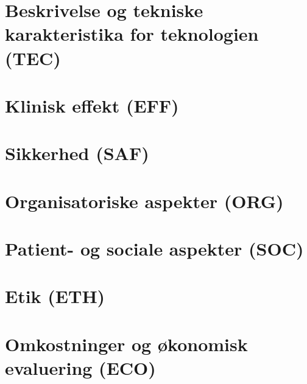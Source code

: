 \chapter{Beskrivelse og tekniske karakteristika for teknologien (TEC)}\vspace{-.75cm} \label{TEC_chap}


\chapter{Klinisk effekt (EFF)}\vspace{-.75cm} \label{EFF_chap}


\chapter{Sikkerhed (SAF)}\vspace{-.75cm} \label{SAF_chap}


\chapter{Organisatoriske aspekter (ORG)}\vspace{-.75cm} \label{ORG_chap}


\chapter{Patient- og sociale aspekter (SOC)}\vspace{-.75cm} \label{SOC_chap}


\chapter{Etik (ETH)}\vspace{-.75cm} \label{ETH_chap}


\chapter{Omkostninger og økonomisk evaluering (ECO)}\vspace{-.75cm} \label{ECO_chap}


%
%
%
\cleardoublepage

\begingroup
\label{litteraturliste}
\raggedright


\endgroup

\begin{appendices}
%	
%	
\end{appendices}


